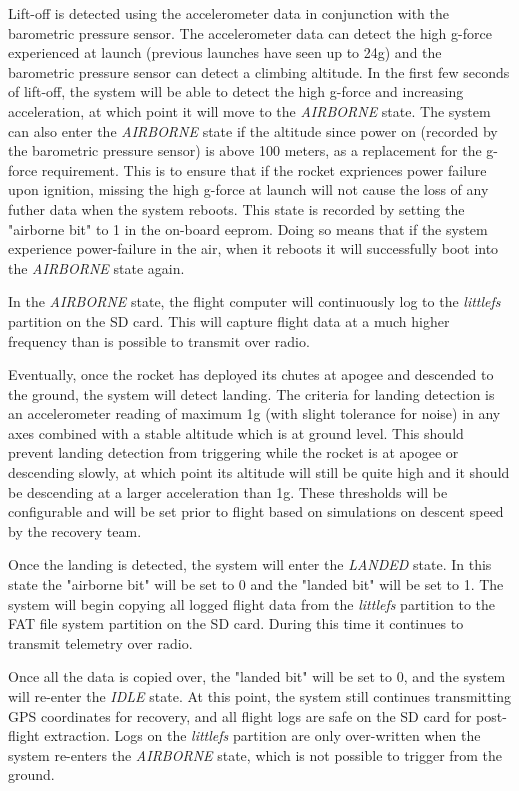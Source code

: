 Lift-off is detected using the accelerometer data in conjunction with the barometric pressure sensor. The accelerometer
data can detect the high g-force experienced at launch (previous launches have seen up to 24g) and the barometric
pressure sensor can detect a climbing altitude. In the first few seconds of lift-off, the system will be able to detect
the high g-force and increasing acceleration, at which point it will move to the \textit{AIRBORNE} state. The system can
also enter the \textit{AIRBORNE} state if the altitude since power on (recorded by the barometric pressure sensor) is above
100 meters, as a replacement for the g-force requirement. This is to ensure that if the rocket expriences power failure
upon ignition, missing the high g-force at launch will not cause the loss of any futher data when the system reboots.
This state is recorded by setting the "airborne bit" to 1 in the on-board \gls{eeprom}. Doing so means that if the system
experience power-failure in the air, when it reboots it will successfully boot into the \textit{AIRBORNE} state again.

In the \textit{AIRBORNE} state, the flight computer will continuously log to the \textit{littlefs} partition on the SD
card. This will capture flight data at a much higher frequency than is possible to transmit over radio.

Eventually, once the rocket has deployed its chutes at apogee and descended to the ground, the system will detect
landing. The criteria for landing detection is an accelerometer reading of maximum 1g (with slight tolerance for noise)
in any axes combined with a stable altitude which is at ground level. This should prevent landing detection from
triggering while the rocket is at apogee or descending slowly, at which point its altitude will still be quite high and
it should be descending at a larger acceleration than 1g. These thresholds will be configurable and will be set prior
to flight based on simulations on descent speed by the recovery team.

Once the landing is detected, the system will enter the \textit{LANDED} state. In this state the "airborne bit" will be
set to 0 and the "landed bit" will be set to 1. The system will begin copying all logged flight data from the
\textit{littlefs} partition to the FAT file system partition on the SD card. During this time it continues to transmit
telemetry over radio.

Once all the data is copied over, the "landed bit" will be set to 0, and the system will re-enter the \textit{IDLE}
state. At this point, the system still continues transmitting GPS coordinates for recovery, and all flight logs are
safe on the SD card for post-flight extraction. Logs on the \textit{littlefs} partition are only over-written when the
system re-enters the \textit{AIRBORNE} state, which is not possible to trigger from the ground.

